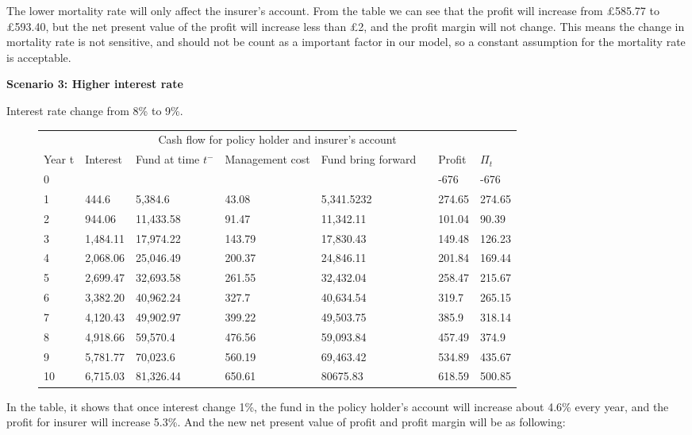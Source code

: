 \documentclass{report}
\begin{document}
The lower mortality rate will only affect the insurer's account. From the table we can see that the profit will increase from \pounds585.77 to \pounds 593.40, but the net present value of the profit will increase less than \pounds2, and the profit margin will not change. This means the change in mortality rate is not sensitive, and should not be count as a important factor in our model, so a constant assumption for the mortality rate is acceptable.



\textbf{Scenario 3: Higher interest rate} 

Interest rate change from 8\% to 9\%.


\begin{figure}[H]
\begin{tabular}{p{1cm} p{1.5cm} p{2cm} p{2cm} p{1cm} p{1.5cm} p{1.5cm} p{1.5cm} }
\toprule
\multicolumn{8}{c}{Cash flow for policy holder and insurer's account} \\
\cmidrule(r){3-7}

Year t & Interest &Fund at time $t^-$ & Management cost  & Fund bring forward & & Profit& $\Pi_t$ \\
\midrule
0&&&&&&-676&-676\\
1&444.6&5,384.6&43.08&5,341.5232&&274.65&274.65\\
2&944.06&11,433.58&91.47&11,342.11&&101.04&90.39\\
3&1,484.11&17,974.22&143.79&17,830.43&&149.48&126.23\\
4&2,068.06&25,046.49&200.37&24,846.11&&201.84&169.44\\
5&2,699.47&32,693.58&261.55&32,432.04&&258.47&215.67\\
6&3,382.20&40,962.24&327.7&40,634.54&&319.7&265.15\\
7&4,120.43&49,902.97&399.22&49,503.75&&385.9&318.14\\
8&4,918.66&59,570.4&476.56&59,093.84&&457.49&374.9\\
9&5,781.77&70,023.6&560.19&69,463.42&&534.89&435.67\\
10&6,715.03&81,326.44&650.61&\color{red}80675.83&&\color{red}618.59&500.85\\
\bottomrule
\end{tabular}
\end{figure}


In the table, it shows that once interest change 1\%, the fund in the policy holder's account will increase about 4.6\% every year, and the profit for insurer will increase 5.3\%. And the new net present value of profit and profit margin will be as following:
\end{document}
